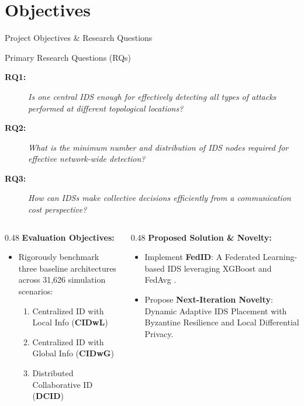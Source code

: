 \documentclass[aspectratio=169, 10pt]{beamer}
\begin{document}
\section{Objectives}
\begin{frame}{Project Objectives \& Research Questions}
  \begin{block}{Primary Research Questions (RQs)}
    \begin{description}
      \item[\textbf{RQ1:}] \textit{Is one central IDS enough for effectively detecting all types of attacks performed at different topological locations?}
      \item[\textbf{RQ2:}] \textit{What is the minimum number and distribution of IDS nodes required for effective network-wide detection?}
      \item[\textbf{RQ3:}] \textit{How can IDSs make collective decisions efficiently from a communication cost perspective?}
    \end{description}
  \end{block}
  \vspace{0.2cm}
  \begin{columns}[T]
    \begin{column}{0.48\textwidth}
      \textbf{Evaluation Objectives:}
      \begin{itemize}
        \item Rigorously benchmark three baseline architectures across 31,626 simulation scenarios:
          \begin{enumerate}
            \item Centralized ID with Local Info (\textbf{CIDwL})
            \item Centralized ID with Global Info (\textbf{CIDwG})
            \item Distributed Collaborative ID (\textbf{DCID})
          \end{enumerate}
      \end{itemize}
    \end{column}
    \begin{column}{0.48\textwidth}
      \textbf{Proposed Solution \& Novelty:}
      \begin{itemize}
        \item Implement \textbf{FedID}: A Federated Learning-based IDS leveraging XGBoost and FedAvg \cite{yilmaz2025exploring}.
        \item Propose \textbf{Next-Iteration Novelty}: Dynamic Adaptive IDS Placement with Byzantine Resilience and Local Differential Privacy.
      \end{itemize}
    \end{column}
  \end{columns}
\end{frame}
\end{document}
